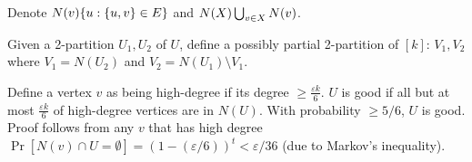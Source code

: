\documentclass{idc_msc}
\let\defeq\relax
\newcommand\defeq{\stackrel{\mathclap{\normalfont\mbox{def}}}{=}}
\begin{document}
Denote \(N(v) \defeq \{u : \{u, v\} \in E\}\) and \(N(X) \defeq \bigcup_{v \in X} N(v)\).

Given a 2-partition \(U_1, U_2\) of \(U\), define a possibly partial 2-partition of \([k]\): \(V_1, V_2\) where \(V_1 = N(U_2)\) and \(V_2 = N(U_1) \setminus V_1\).

Define a vertex \(v\) as being high-degree if its degree \(\ge \frac{\varepsilon k}{6}\).
\(U\) is good if all but at most \(\frac{\varepsilon k}{6}\) of high-degree vertices are in \(N(U)\).
With probability \(\ge 5/6\), \(U\) is good.
Proof follows from any \(v\) that has high degree \(\Pr[N(v) \cap U = \emptyset] = (1-(\varepsilon / 6))^t < \varepsilon / 36\) (due to Markov's inequality).
\end{document}
